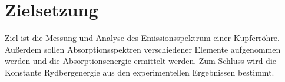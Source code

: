 \section{Zielsetzung}
\label{sec:Zielsetzung}
Ziel ist die Messung und Analyse des Emissionsspektrum einer Kupferröhre.
Außerdem sollen Absorptionsspektren verschiedener Elemente aufgenommen werden und die Absorptionsenergie ermittelt werden.
Zum Schluss wird die Konstante Rydbergenergie aus den experimentellen Ergebnissen bestimmt.